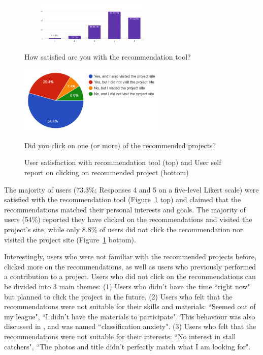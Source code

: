 \documentclass[letterpaper]{article} %
\begin{document}
\begin{figure}
\centering
\begin{small}
\end{small}
\includegraphics[width=7cm,height=2cm]{survrec.png}

How satisfied are you with the recommendation tool?

\begin{small}\end{small}
\includegraphics[width=7cm]{graph_survey1.png}

Did you click on one (or more) of the recommended projects?
    \caption{User satisfaction with recommendation tool (top) and User self report on clicking on recommended project (bottom)}
     \label{fig:userstudy}%
 \end{figure}
The majority of users (73.3\%; Responses 4 and 5 on a five-level Likert scale) were satisfied with the recommendation tool (Figure~\ref{fig:userstudy} top) and claimed that the recommendations matched their personal interests and goals. The majority of users (54\%) reported they have clicked on the recommendations and visited the project's site, while only 8.8\% of users did not click the recommendation nor visited the project site (Figure~\ref{fig:userstudy} bottom).


Interestingly, users who were not familiar with the recommended projects before, clicked more on the recommendations, as well as users who previously performed a contribution to a project.
Users who did not click on the recommendations can be divided into 3 main themes: (1) Users who didn't have the time ``right now" but planned to click the project in the future. (2) Users who felt that the recommendations were not suitable for their skills and materials: ``Seemed out of my league", ``I didn't have the materials to participate". This behaviour was also discussed in \cite{segal2015improving}, and was named ``classification anxiety". (3) Users who felt that the recommendations were not suitable for their interests: ``No interest in stall catchers", ``The photos and title didn't perfectly match what I am looking for".
\end{document}
